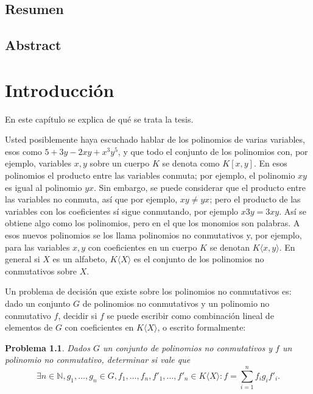 \documentclass[12pt]{report}
\theoremstyle{customstyle}
\newtheorem{problem}{Problema}
\theoremstyle{factstyle}
\newcommand\cpp{C\nolinebreak[4]\hspace{-.05em}\raisebox{.4ex}{\relsize{-3}{\textbf{++}}}\xspace}
\begin{document}
\def\tituloTesis{Implementación de bases de Gröbner no conmutativas en \cpp con un poquito de paralelismo} %


\section*{Resumen} %


\section*{Abstract} %

\tableofcontents

\chapter{Introducción}

En este capítulo se explica de qué se trata la tesis.

Usted posiblemente haya escuchado hablar de los polinomios de varias variables, esos como $5 + 3 y - 2 x y + x^3 y^5$, y que todo el conjunto de los polinomios con, por ejemplo, variables $x, y$ sobre un cuerpo $K$ se denota como $K[x, y]$. En esos polinomios el producto entre las variables conmuta; por ejemplo, el polinomio $x y$ es igual al polinomio $y x$. Sin embargo, se puede considerar que el producto entre las variables no conmuta, así que por ejemplo, $x y ≠ y x$; pero el producto de las variables con los coeficientes sí sigue conmutando, por ejemplo $x 3 y = 3 x y$. Así se obtiene algo como los polinomios, pero en el que los monomios son palabras. A esos nuevos polinomios se los llama polinomios no conmutativos y, por ejemplo, para las variables $x, y$ con coeficientes en un cuerpo $K$ se denotan $K⟨x, y⟩$. En general si $X$ es un alfabeto, $K⟨X⟩$ es el conjunto de los polinomios no conmutativos sobre $X$.

Un problema de decisión que existe sobre los polinomios no conmutativos es: dado un conjunto $G$ de polinomios no conmutativos y un polinomio no conmutativo $f$, decidir si $f$ se puede escribir como combinación lineal de elementos de $G$ con coeficientes en $K⟨X⟩$, o escrito formalmente:

\begin{problem}\label{problem:principal}
  Dados $G$ un conjunto de polinomios no conmutativos y $f$ un polinomio no conmutativo, determinar si vale que
  \[ ∃n ∈ ℕ, g_1, …, g_n ∈ G, f_1, …, f_n, f'_1, …, f'_n ∈ K⟨X⟩ : f = ∑_{i = 1}^n f_i g_i f'_i \text{.}\]
\end{problem}
\end{document}
